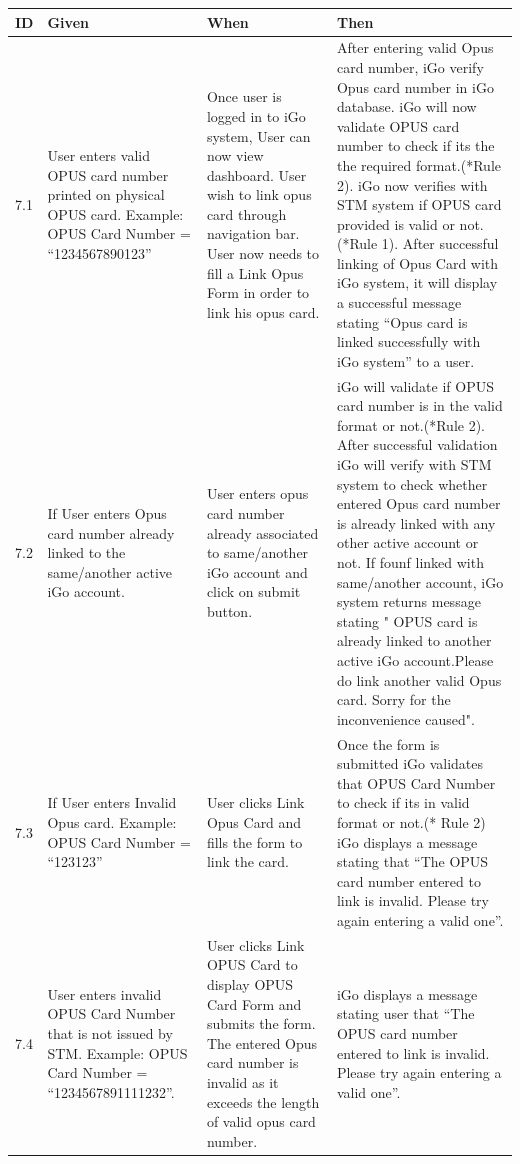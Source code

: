 \documentclass[11pt, english]{report}
\begin{document}
\begin{longtable}
{ |p{0.5cm}|p{3cm}|p{3.5cm}|p{5cm}| }
\hline
\textbf{ID} & \textbf{Given} & \textbf{When} & \textbf{Then}\\
\hline

7.1&
User enters valid OPUS card number printed on physical OPUS card.
Example: 
OPUS Card Number = “1234567890123”

& 
Once user is logged in to iGo system, User can now view dashboard.
User wish to link opus card through navigation bar.
User now needs to fill a Link Opus Form in order to link his opus card. &
After entering valid Opus card number, iGo verify Opus card number in iGo database.
iGo will now validate OPUS card number to check if its the the required format.(*Rule 2).
iGo now verifies with STM system if OPUS card provided is valid or not.(*Rule 1).
After successful linking of Opus Card with iGo system, it will display a  successful message stating “Opus card is linked successfully with iGo system” to a user.
\\
\hline
7.2&
If User enters Opus card number already linked to the same/another active iGo account.&
User enters opus card number already associated to same/another iGo account and click on submit button. &
iGo will validate if OPUS card number is in the valid format or not.(*Rule 2).
After successful validation iGo will verify with STM system to check whether entered Opus card number is already linked with any other active account or not. If founf linked with same/another account, iGo system returns message stating " OPUS card is already linked to another active iGo account.Please do link another valid Opus card. Sorry for the inconvenience caused".
 \\
\hline

7.3&
If User enters Invalid Opus card.
Example:
OPUS Card Number = “123123”&
User clicks Link Opus Card and fills the form to link the card.&
Once the form is submitted iGo validates that OPUS Card Number to check if its in valid format or not.(* Rule 2)
iGo displays a message stating that “The OPUS card number entered to link is invalid. Please try again entering a valid one”.
 \\
\hline

7.4&
User enters invalid OPUS Card Number that is not issued by STM.
Example: 
OPUS Card Number = “1234567891111232”.
&
User clicks Link OPUS Card to display OPUS Card Form and submits the form.
The entered Opus card number is invalid as it exceeds the length of valid opus card number.
&
iGo displays a  message stating user that “The OPUS card number entered to link is invalid. Please try again entering a valid one”.
\\
\hline
\end{longtable}
\end{document}
